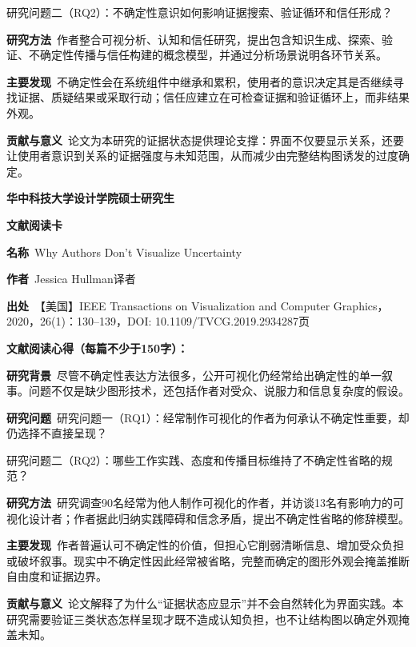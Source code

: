 研究问题二（RQ2）：不确定性意识如何影响证据搜索、验证循环和信任形成？\par
\noindent\textbf{研究方法}\ 作者整合可视分析、认知和信任研究，提出包含知识生成、探索、验证、不确定性传播与信任构建的概念模型，并通过分析场景说明各环节关系。\par
\noindent\textbf{主要发现}\ 不确定性会在系统组件中继承和累积，使用者的意识决定其是否继续寻找证据、质疑结果或采取行动；信任应建立在可检查证据和验证循环上，而非结果外观。\par
\noindent\textbf{贡献与意义}\ 论文为本研究的证据状态提供理论支撑：界面不仅要显示关系，还要让使用者意识到关系的证据强度与未知范围，从而减少由完整结构图诱发的过度确定。\par
\clearpage
\begin{center}
{\songti\bfseries\fontsize{18.5pt}{27.75pt}\selectfont 华中科技大学设计学院硕士研究生\par}
{\songti\bfseries\fontsize{18.5pt}{27.75pt}\selectfont 文献阅读卡\par}
\end{center}
\vspace{0.25em}
\noindent\underline{}\par
\vspace{0.35em}
\noindent\textbf{名称}\ Why Authors Don't Visualize Uncertainty\par
\noindent\textbf{作者}\ Jessica Hullman\quad 译者\par
\noindent\textbf{出处}\ 【美国】IEEE Transactions on Visualization and Computer Graphics，2020，26(1)：130–139，DOI: 10.1109/TVCG.2019.2934287\quad 页\par
\vspace{0.35em}
\noindent\textbf{文献阅读心得（每篇不少于150字）：}\par
\noindent\textbf{研究背景}\ 尽管不确定性表达方法很多，公开可视化仍经常给出确定性的单一叙事。问题不仅是缺少图形技术，还包括作者对受众、说服力和信息复杂度的假设。\par
\noindent\textbf{研究问题}\ 研究问题一（RQ1）：经常制作可视化的作者为何承认不确定性重要，却仍选择不直接呈现？\par
研究问题二（RQ2）：哪些工作实践、态度和传播目标维持了不确定性省略的规范？\par
\noindent\textbf{研究方法}\ 研究调查90名经常为他人制作可视化的作者，并访谈13名有影响力的可视化设计者；作者据此归纳实践障碍和信念矛盾，提出不确定性省略的修辞模型。\par
\noindent\textbf{主要发现}\ 作者普遍认可不确定性的价值，但担心它削弱清晰信息、增加受众负担或破坏叙事。现实中不确定性因此经常被省略，完整而确定的图形外观会掩盖推断自由度和证据边界。\par
\noindent\textbf{贡献与意义}\ 论文解释了为什么“证据状态应显示”并不会自然转化为界面实践。本研究需要验证三类状态怎样呈现才既不造成认知负担，也不让结构图以确定外观掩盖未知。\par
